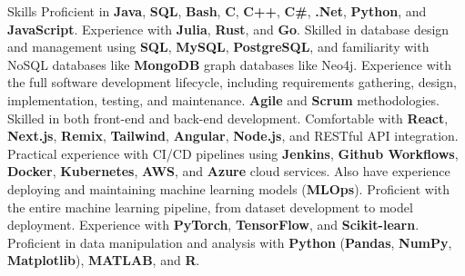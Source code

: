 \begin{rubric}{Skills}
    Proficient in \textbf{Java}, \textbf{SQL}, \textbf{Bash}, \textbf{C}, \textbf{C++}, \textbf{C\#}, \textbf{.Net}, \textbf{Python}, and \textbf{JavaScript}. Experience with \textbf{Julia}, \textbf{Rust}, and \textbf{Go}.
    Skilled in database design and management using \textbf{SQL}, \textbf{MySQL}, \textbf{PostgreSQL}, and familiarity with NoSQL databases like \textbf{MongoDB} graph databases like Neo4j.
    Experience with the full software development lifecycle, including requirements gathering, design, implementation, testing, and maintenance. \textbf{Agile} and \textbf{Scrum} methodologies.
    Skilled in both front-end and back-end development. Comfortable with \textbf{React}, \textbf{Next.js}, \textbf{Remix}, \textbf{Tailwind}, \textbf{Angular}, \textbf{Node.js}, and RESTful API integration.
    Practical experience with CI/CD pipelines using \textbf{Jenkins}, \textbf{Github Workflows}, \textbf{Docker}, \textbf{Kubernetes}, \textbf{AWS}, and \textbf{Azure} cloud services. Also have experience deploying and maintaining machine learning models (\textbf{MLOps}).
    Proficient with the entire machine learning pipeline, from dataset development to model deployment. Experience with \textbf{PyTorch}, \textbf{TensorFlow}, and \textbf{Scikit-learn}.
    Proficient in data manipulation and analysis with \textbf{Python} (\textbf{Pandas}, \textbf{NumPy}, \textbf{Matplotlib}), \textbf{MATLAB}, and \textbf{R}.
\end{rubric}
